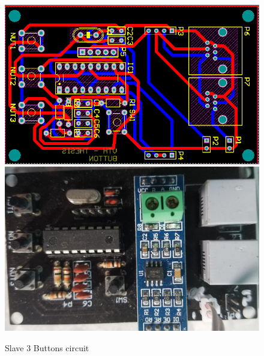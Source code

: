 \begin{figure}[!htbp]
    \begin{center}
    \includegraphics[scale=0.75]{images/s3bLayout.png}\\

    \includegraphics[scale=0.13]{images/s3b.jpg}
    \caption{Slave 3 Buttons circuit}
    \label{fig:slave3ButtonsCircuit}
    \end{center}
\end{figure}
